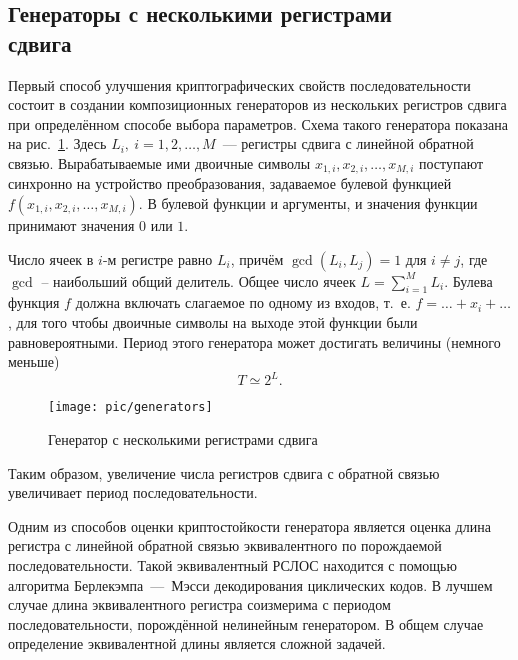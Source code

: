 \subsection[Генераторы с несколькими регистрами сдвига]{Генераторы с несколькими регистрами \protect\\ сдвига}

Первый способ улучшения криптографических свойств последовательности состоит в создании композиционных генераторов из нескольких регистров сдвига при определённом способе выбора параметров. Схема такого генератора показана на рис.~\ref{fig:generators}. Здесь $L_i, ~ i = 1, 2, \dots, M$~--- регистры сдвига с линейной обратной связью. Вырабатываемые ими двоичные символы $x_{1,i}, x_{2,i}, \dots, x_{M,i}$ поступают синхронно на устройство преобразования, задаваемое булевой функцией $f(x_{1,i}, x_{2,i}, \dots, x_{M,i})$. В булевой функции и аргументы, и значения функции принимают значения $0$ или $1$.

Число ячеек в $i$-м регистре равно $L_{i}$, причём $\gcd(L_i, L_j)=1$ для $i \neq j$, где $\gcd$ -- наибольший общий делитель. Общее число ячеек $L = \sum\limits_{i=1}^M L_i$. Булева функция $f$ должна включать слагаемое по одному из входов, т.~е. $f = \dots + x_i + \dots$, для того чтобы двоичные символы на выходе этой функции были равновероятными. Период этого генератора может достигать величины (немного меньше)
    \[ T \simeq 2^L. \]

\begin{figure}[!ht]
	\centering
	\texttt{[image: pic/generators]}
    \caption{Генератор с несколькими регистрами сдвига\label{fig:generators}}
\end{figure}

Таким образом, увеличение числа регистров сдвига с обратной связью увеличивает период последовательности.

Одним из способов оценки криптостойкости генератора является оценка длина регистра с линейной обратной связью эквивалентного по порождаемой последовательности. Такой эквивалентный РСЛОС находится с помощью алгоритма Берлекэмпа~---~Мэсси декодирования циклических кодов. В лучшем случае длина эквивалентного регистра соизмерима с периодом последовательности, порождённой нелинейным генератором. В общем случае определение эквивалентной длины является сложной задачей.
